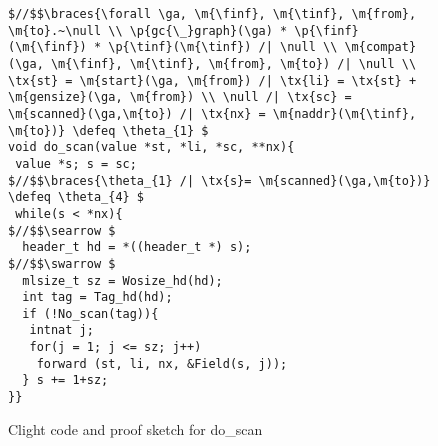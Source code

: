 \begin{figure}[t]
\vspace{-1ex}
  \begin{lstlisting}[multicols = 2]
$//$$\braces{\forall \ga, \m{\finf}, \m{\tinf}, \m{from}, \m{to}.~\null \\ \p{gc{\_}graph}(\ga) * \p{\finf}(\m{\finf}) * \p{\tinf}(\m{\tinf}) /| \null \\ \m{compat}(\ga, \m{\finf}, \m{\tinf}, \m{from}, \m{to}) /| \null \\ \tx{st} = \m{start}(\ga, \m{from}) /| \tx{li} = \tx{st} + \m{gensize}(\ga, \m{from}) \\ \null /| \tx{sc} = \m{scanned}(\ga,\m{to}) /| \tx{nx} = \m{naddr}(\m{\tinf}, \m{to})} \defeq \theta_{1} $
void do_scan(value *st, *li, *sc, **nx){
 value *s; s = sc;
$//$$\braces{\theta_{1} /| \tx{s}= \m{scanned}(\ga,\m{to})} \defeq \theta_{4} $
 while(s < *nx){
$//$$\searrow $
  header_t hd = *((header_t *) s);
$//$$\swarrow $
  mlsize_t sz = Wosize_hd(hd);
  int tag = Tag_hd(hd);
  if (!No_scan(tag)){
   intnat j;
   for(j = 1; j <= sz; j++)
    forward (st, li, nx, &Field(s, j)); 
  } s += 1+sz;
}} 
\end{lstlisting}

\vspace{-0.4em}
\caption{Clight code and proof sketch for do\_scan}
\label{fig:doscan}
\vspace{-1em}
\end{figure}